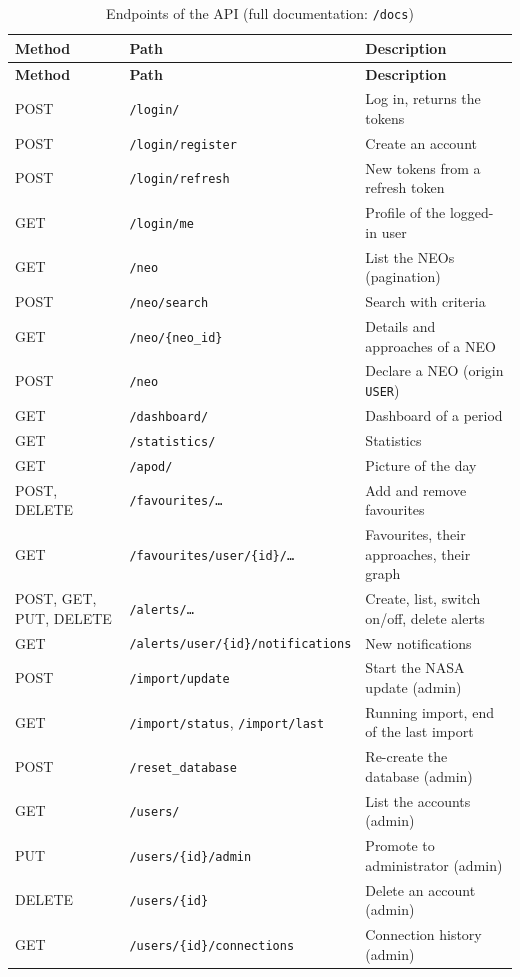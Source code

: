 \begin{longtable}{l p{5.6cm} p{6.4cm}}
\caption{Endpoints of the API (full documentation: \texttt{/docs})} \\
\toprule
\textbf{Method} & \textbf{Path} & \textbf{Description} \\
\midrule
\endfirsthead
\toprule
\textbf{Method} & \textbf{Path} & \textbf{Description} \\
\midrule
\endhead
POST & \texttt{/login/} & Log in, returns the tokens \\
POST & \texttt{/login/register} & Create an account \\
POST & \texttt{/login/refresh} & New tokens from a refresh token \\
GET & \texttt{/login/me} & Profile of the logged-in user \\
GET & \texttt{/neo} & List the NEOs (pagination) \\
POST & \texttt{/neo/search} & Search with criteria \\
GET & \texttt{/neo/\{neo\_id\}} & Details and approaches of a NEO \\
POST & \texttt{/neo} & Declare a NEO (origin \texttt{USER}) \\
GET & \texttt{/dashboard/} & Dashboard of a period \\
GET & \texttt{/statistics/} & Statistics \\
GET & \texttt{/apod/} & Picture of the day \\
POST, DELETE & \texttt{/favourites/\dots} & Add and remove favourites \\
GET & \texttt{/favourites/user/\{id\}/\dots} & Favourites, their approaches, their graph \\
POST, GET, PUT, DELETE & \texttt{/alerts/\dots} & Create, list, switch on/off, delete alerts \\
GET & \texttt{/alerts/user/\{id\}/notifications} & New notifications \\
POST & \texttt{/import/update} & Start the NASA update (admin) \\
GET & \texttt{/import/status}, \texttt{/import/last} & Running import, end of the last import \\
POST & \texttt{/reset\_database} & Re-create the database (admin) \\
GET & \texttt{/users/} & List the accounts (admin) \\
PUT & \texttt{/users/\{id\}/admin} & Promote to administrator (admin) \\
DELETE & \texttt{/users/\{id\}} & Delete an account (admin) \\
GET & \texttt{/users/\{id\}/connections} & Connection history (admin) \\
\bottomrule
\end{longtable}
